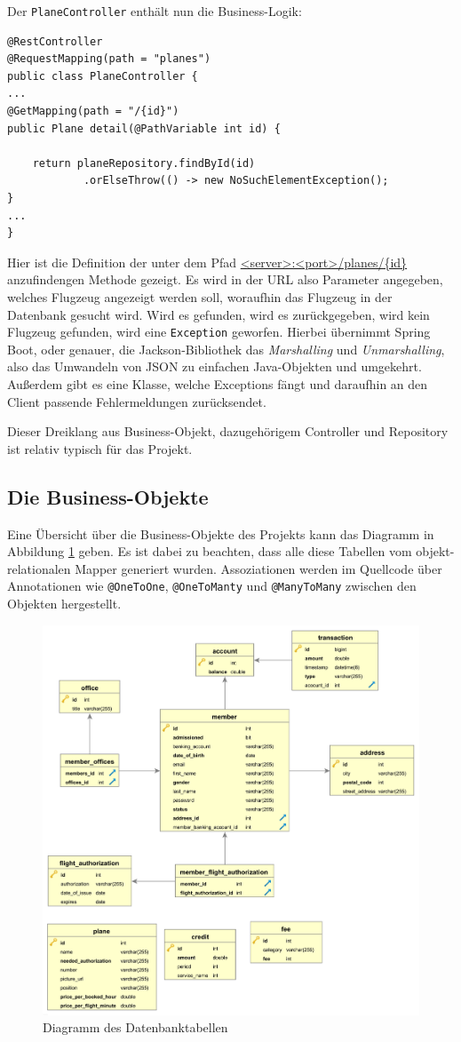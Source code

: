 \documentclass[a4paper, 11pt]{article}
\begin{document}
Der \texttt{PlaneController} enthält nun die Business-Logik:

\begin{lstlisting}
@RestController
@RequestMapping(path = "planes")
public class PlaneController {
...
@GetMapping(path = "/{id}")
public Plane detail(@PathVariable int id) {

    return planeRepository.findById(id)
            .orElseThrow(() -> new NoSuchElementException();
}
...
}
\end{lstlisting}

Hier ist die Definition der unter dem Pfad \url{<server>:<port>/planes/{id}}
anzufindengen Methode gezeigt. Es wird in der URL also Parameter angegeben,
welches Flugzeug angezeigt werden soll, woraufhin das Flugzeug in der Datenbank
gesucht wird. Wird es gefunden, wird es zurückgegeben, wird kein Flugzeug
gefunden, wird eine \lstinline{Exception} geworfen. Hierbei übernimmt Spring
Boot, oder genauer, die Jackson-Bibliothek das \emph{Marshalling} und
\emph{Unmarshalling}, also das Umwandeln von JSON zu einfachen Java-Objekten
und umgekehrt. Außerdem gibt es eine Klasse, welche Exceptions fängt und
daraufhin an den Client passende Fehlermeldungen zurücksendet.

Dieser Dreiklang aus Business-Objekt, dazugehörigem Controller und Repository
ist relativ typisch für das Projekt.

\subsection{Die Business-Objekte}

Eine Übersicht über die Business-Objekte des Projekts kann das Diagramm in
Abbildung \ref{fig:erm_all} geben. Es ist dabei zu beachten, dass alle diese
Tabellen vom objekt-relationalen Mapper generiert wurden. Assoziationen werden
im Quellcode über Annotationen wie \lstinline{@OneToOne},
\lstinline{@OneToManty} und \lstinline{@ManyToMany} zwischen den Objekten
hergestellt.

\begin{figure}[htpb]
    \centering
    \includegraphics[width=\textwidth]{images/erm/all_orthogonal.png}
    \caption{Diagramm des Datenbanktabellen}
    \label{fig:erm_all}
\end{figure}
\end{document}
